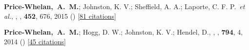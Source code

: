 \item[{\color{deemph}\scriptsize2}]\textbf{Price-Whelan,~A.~M.}; Johnston, K. V.; Sheffield, A. A.; Laporte, C. F. P.~\textit{et al.}, , \mnras, \textbf{452}, 676, 2015 () [\href{http://adsabs.harvard.edu/abs/2015MNRAS.452..676P}{81 citations}]

\item[{\color{deemph}\scriptsize1}]\textbf{Price-Whelan,~A.~M.}; Hogg, D. W.; Johnston, K. V.; Hendel, D., , \apj, \textbf{794}, 4, 2014 () [\href{http://adsabs.harvard.edu/abs/2014ApJ...794....4P}{45 citations}]